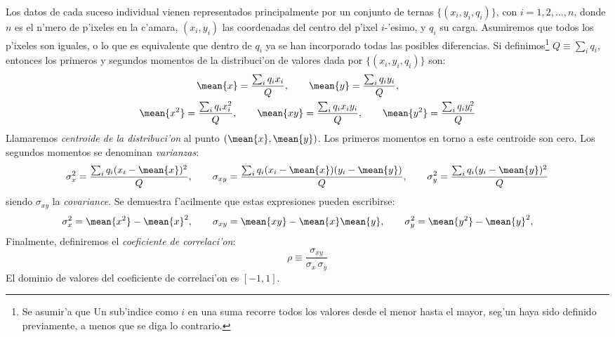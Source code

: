 Los datos de cada suceso individual vienen representados
principalmente por un conjunto de ternas $\{(x_i, y_i, q_i)\}$, con
$i=1,2,\ldots,n$, donde $n$ es el n'mero de p'ixeles en la c'amara,
$(x_i, y_i)$ las coordenadas del centro del p'ixel $i$-'esimo, y $q_i$
su carga. Asumiremos que todos los p'ixeles son iguales, o lo que es
equivalente que dentro de $q_i$ ya se han incorporado todas las
posibles diferencias. Si definimos\footnote{Se asumir'a que Un
  sub'indice como $i$ en una suma recorre todos los valores desde el
  menor hasta el mayor, seg'un haya sido definido previamente, a menos
  que se diga lo contrario.} $Q\equiv\sum_i q_i$, entonces los
primeros y segundos momentos de la distribuci'on de valores dada por
$\{(x_i, y_i, q_i)\}$ son:
%
\begin{gather}
  \label{eq:defmeans}
  \mean{x} = \frac{\sum_i q_i x_i}{Q}, \qquad
  \mean{y} = \frac{\sum_i q_i y_i}{Q}, \qquad
  \\
  \label{eq:defmeans2}
  \mean{x^2} = \frac{\sum_i q_i x_i^2}{Q}, \qquad
  \mean{xy} = \frac{\sum_i q_i x_i y_i}{Q}, \qquad
  \mean{y^2} = \frac{\sum_i q_i y_i^2}{Q}
\end{gather}
%
Llamaremos \emph{centroide de la distribuci'on} al punto
$(\mean{x},\mean{y})$. Los primeros momentos en torno a este centroide
son cero. Los segundos momentos se denominan \emph{varianzas}:
%
\begin{equation}
  \label{eq:defvar}
  \sigma_x^2  = \frac{\sum_i q_i (x_i - \mean{x})^2}{Q}, \qquad
  \sigma_{xy} = \frac{\sum_i q_i 
    (x_i - \mean{x})(y_i - \mean{y})}{Q}, \qquad
  \sigma_y^2  = \frac{\sum_i q_i (y_i - \mean{y})^2}{Q}
\end{equation}
%
siendo $\sigma_{xy}$ la \emph{covariance}. Se demuestra f'acilmente
que estas expresiones pueden escribirse:
%
\begin{equation}
  \label{eq:defvarbis}
  \sigma_x^2  = \mean{x^2} - \mean{x}^2, \qquad 
  \sigma_{xy}  = \mean{xy} - \mean{x}\mean{y}, \qquad 
  \sigma_y^2  = \mean{y^2} - \mean{y}^2, \qquad 
\end{equation}
%
Finalmente, definiremos el \emph{coeficiente de correlaci'on}:
\begin{equation}
  \label{eq:corr}
  \rho\equiv\frac{\sigma_{xy}}{\sigma_x\, \sigma_y}
\end{equation}
%
El dominio de valores del coeficiente de correlaci'on es $[-1,1]$.

